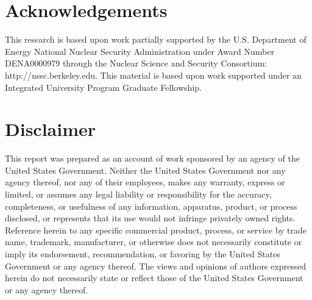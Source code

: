 \documentclass[preprint,12pt]{elsarticle}
\begin{document}


\section*{Acknowledgements}
\label{sec:ack}

This research is based upon work partially supported by the U.S. Department of Energy National Nuclear Security Administration under Award Number DENA0000979 through the Nuclear Science and Security Consortium: http://nssc.berkeley.edu.
This material is based upon work supported under an Integrated University Program Graduate Fellowship.

\section*{Disclaimer}
\label{sec:disc}

This report was prepared as an account of work sponsored by an agency of the United States Government. Neither the United States Government nor any agency thereof, nor any of their employees, makes any warranty, express or limited, or assumes any legal liability or responsibility for the accuracy, completeness, or usefulness of any information, apparatus, product, or process disclosed, or represents that its use would not infringe privately owned rights. Reference herein to any specific commercial product, process, or service by trade name, trademark, manufacturer, or otherwise does not necessarily constitute or imply its endorsement, recommendation, or favoring by the United States Government or any agency thereof. The views and opinions of authors expressed herein do not necessarily state or reflect those of the United States Government or any agency thereof.



\end{document}
